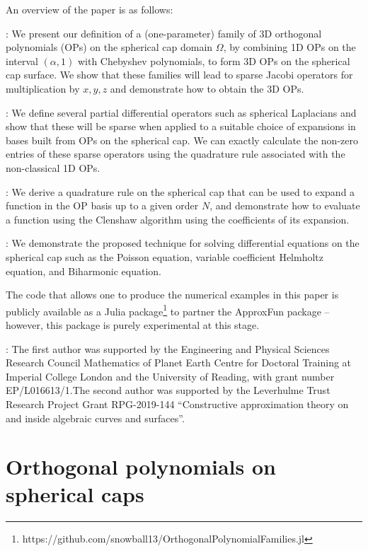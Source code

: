 \documentclass[11pt, oneside]{article}   	%
\begin{document}
An overview of the paper is as follows:  

\noindent {}: We present our definition of a (one-parameter) family of 3D orthogonal polynomials (OPs) on the spherical cap domain $\Omega$, by combining 1D OPs on the interval $(\alpha, 1)$ with Chebyshev polynomials, to form 3D OPs on the spherical cap surface. We show that these families will lead to sparse Jacobi operators for multiplication by $x, y, z$ and demonstrate how to obtain the 3D OPs.

\noindent{}: We define several partial differential operators such as spherical Laplacians and  show that these will  be sparse when applied to a suitable choice of expansions in bases built from OPs on the spherical cap. We can exactly calculate the non-zero entries of these sparse operators using the quadrature rule associated with the non-classical 1D OPs.

\noindent{}: We derive a quadrature rule on the spherical cap that can be used to expand a function in the OP basis up to a given order $N$, and demonstrate how to evaluate a function using the Clenshaw algorithm using the coefficients of its expansion.

\noindent{}: We demonstrate the proposed technique for solving differential equations on the spherical cap such as the Poisson equation, variable coefficient Helmholtz equation, and Biharmonic equation.  

The code that allows one to produce the numerical examples in this paper is publicly available as a Julia package\footnote{https://github.com/snowball13/OrthogonalPolynomialFamilies.jl} to partner the ApproxFun package \cite{ApproxFun} -- however, this package is purely experimental at this stage.

: The first author was supported by the Engineering and Physical Sciences Research Council Mathematics of Planet Earth Centre for Doctoral Training at Imperial College London and the University of Reading, with grant number EP/L016613/1.The second author was supported by the Leverhulme Trust Research Project Grant RPG-2019-144 ``Constructive approximation theory on and inside algebraic curves and surfaces''.



\section{Orthogonal polynomials on spherical caps}\label{Section:OPs}
\end{document}
